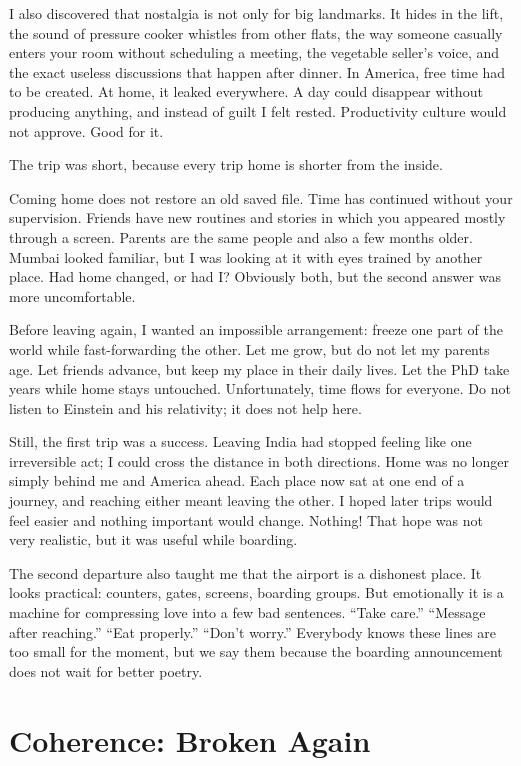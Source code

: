 \documentclass[11pt,twoside,openany]{book}
\newcommand{\scene}{\par\vspace{0.7em}{\centering\color{accent}\rule{0.85cm}{0.6pt}\par}\vspace{0.5em}\noindent\ignorespaces}
\begin{document}
I also discovered that nostalgia is not only for big landmarks. It hides in
the lift, the sound of pressure cooker whistles from other flats, the way
someone casually enters your room without scheduling a meeting, the vegetable
seller's voice, and the exact useless discussions that happen after dinner.
In America, free time had to be created. At home, it leaked everywhere. A day
could disappear without producing anything, and instead of guilt I felt
rested. Productivity culture would not approve. Good for it.

The trip was short, because every trip home is shorter from the inside.

\scene

Coming home does not restore an old saved file. Time has continued without
your supervision. Friends have new routines and stories in which you appeared
mostly through a screen. Parents are the same people and also a few months
older. Mumbai looked familiar, but I was looking at it with eyes trained by
another place. Had home changed, or had I? Obviously both, but the second
answer was more uncomfortable.

Before leaving again, I wanted an impossible arrangement: freeze one part of
the world while fast-forwarding the other. Let me grow, but do not let my
parents age. Let friends advance, but keep my place in their daily lives. Let
the PhD take years while home stays untouched. Unfortunately, time flows for
everyone. Do not listen to Einstein and his relativity; it does not help here.

Still, the first trip was a success. Leaving India had stopped feeling like
one irreversible act; I could cross the distance in both directions. Home was
no longer simply behind me and America ahead. Each place now sat at one end of
a journey, and reaching either meant leaving the other. I hoped later trips
would feel easier and nothing important would change. Nothing! That hope was
not very realistic, but it was useful while boarding.

The second departure also taught me that the airport is a dishonest place. It
looks practical: counters, gates, screens, boarding groups. But emotionally it
is a machine for compressing love into a few bad sentences. ``Take care.''
``Message after reaching.'' ``Eat properly.'' ``Don't worry.'' Everybody knows
these lines are too small for the moment, but we say them because the boarding
announcement does not wait for better poetry.

\chapter{Coherence: Broken Again}
\end{document}
